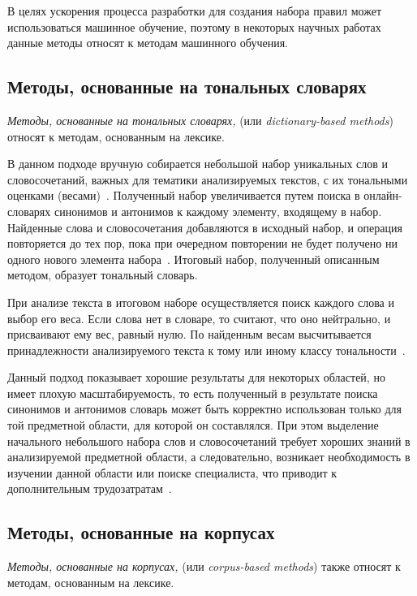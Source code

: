 В целях ускорения процесса разработки для создания набора правил может
использоваться машинное обучение, поэтому в некоторых научных работах
\cite{article16}~\cite{article17} данные методы относят к методам машинного
обучения.

\subsection{Методы, основанные на тональных словарях}

\textit{Методы, основанные на тональных словарях,} (или \textit{dictionary-based
methods}) относят к методам, основанным на лексике.

В данном подходе вручную собирается небольшой набор уникальных слов и
словосочетаний, важных для тематики анализируемых текстов, с их тональными
оценками (весами)~\cite{article05}. Полученный набор увеличивается путем поиска в
онлайн-словарях синонимов и антонимов к каждому элементу, входящему в набор.
Найденные слова и словосочетания добавляются в исходный набор, и операция
повторяется до тех пор, пока при очередном повторении не будет получено ни
одного нового элемента набора~\cite{article4}. Итоговый набор, полученный
описанным методом, образует тональный словарь.

При анализе текста в итоговом наборе осуществляется поиск каждого слова и выбор
его веса. Если слова нет в словаре, то считают, что оно нейтрально, и
присваивают ему вес, равный нулю. По найденным весам высчитывается
принадлежности анализируемого текста к тому или иному классу
тональности~\cite{article05}.

Данный подход показывает хорошие результаты для некоторых областей, но
имеет плохую масштабируемость, то есть полученный в результате поиска
синонимов и антонимов словарь может быть корректно использован только для
той предметной области, для которой он составлялся. При этом выделение
начального небольшого набора слов и словосочетаний требует хороших
знаний в анализируемой предметной области, а следовательно, возникает
необходимость в изучении данной области или поиске специалиста, что приводит к
дополнительным трудозатратам~\cite{article05}.


\subsection{Методы, основанные на корпусах}

\textit{Методы, основанные на корпусах,} (или \textit{corpus-based
methods}) также относят к методам, основанным на лексике.

